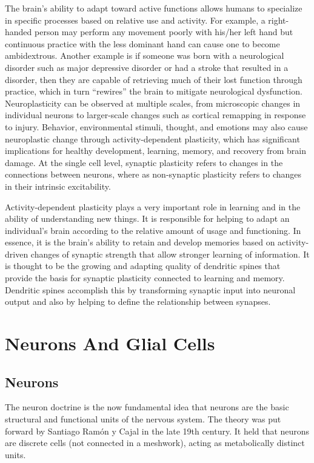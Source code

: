 The brain's ability to adapt toward active functions allows humans to specialize in specific processes based on relative use and activity. For example, a right-handed person may perform any movement poorly with his/her left hand but continuous practice with the less dominant hand can cause one to become ambidextrous. Another example is if someone was born with a neurological disorder such as major depressive disorder or had a stroke that resulted in a disorder, then they are capable of retrieving much of their lost function through practice, which in turn ``rewires'' the brain to mitigate neurological dysfunction.
Neuroplasticity can be observed at multiple scales, from microscopic changes in individual neurons to larger-scale changes such as cortical remapping in response to injury. Behavior, environmental stimuli, thought, and emotions may also cause neuroplastic change through activity-dependent plasticity, which has significant implications for healthy development, learning, memory, and recovery from brain damage. At the single cell level, synaptic plasticity refers to changes in the connections between neurons, where as non-synaptic plasticity refers to changes in their intrinsic excitability.

Activity-dependent plasticity plays a very important role in learning and in the ability of understanding new things. It is responsible for helping to adapt an individual's brain according to the relative amount of usage and functioning. In essence, it is the brain's ability to retain and develop memories based on activity-driven changes of synaptic strength that allow stronger learning of information. It is thought to be the growing and adapting quality of dendritic spines that provide the basis for synaptic plasticity connected to learning and memory. Dendritic spines accomplish this by transforming synaptic input into neuronal output and also by helping to define the relationship between synapses.

\hypertarget{neurons-and-glial-cells}{%
\chapter{Neurons And Glial Cells}\label{neurons-and-glial-cells}}

\hypertarget{neurons}{%
\section{Neurons}\label{neurons}}

The neuron doctrine is the now fundamental idea that neurons are the basic structural and functional units of the nervous system. The theory was put forward by Santiago Ramón y Cajal in the late 19th century. It held that neurons are discrete cells (not connected in a meshwork), acting as metabolically distinct units.

